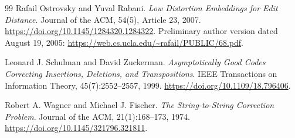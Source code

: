 \begin{thebibliography}{99}
Rafail Ostrovsky and Yuval Rabani.
\emph{Low Distortion Embeddings for Edit Distance}.
Journal of the ACM, 54(5), Article 23, 2007.
\url{https://doi.org/10.1145/1284320.1284322}.
Preliminary author version dated August 19, 2005:
\url{https://web.cs.ucla.edu/~rafail/PUBLIC/68.pdf}.

Leonard J. Schulman and David Zuckerman.
\emph{Asymptotically Good Codes Correcting Insertions, Deletions,
and Transpositions}.
IEEE Transactions on Information Theory, 45(7):2552--2557, 1999.
\url{https://doi.org/10.1109/18.796406}.

Robert A. Wagner and Michael J. Fischer.
\emph{The String-to-String Correction Problem}.
Journal of the ACM, 21(1):168--173, 1974.
\url{https://doi.org/10.1145/321796.321811}.

\end{thebibliography}
